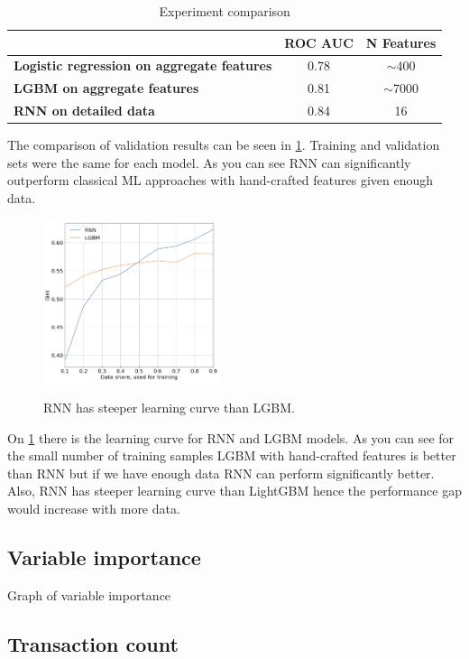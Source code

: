 \documentclass{sigkddExp}
\begin{document}
\begin{table}
\caption{Experiment comparison}
\begin{tabular}{ | p{12em} | c | c | }
\hline
& \textbf{ROC AUC} & \textbf{N Features} \\
\hline
\textbf{Logistic regression on aggregate features} & 0.78 & $\sim400$ \\
\textbf{LGBM on aggregate features} & 0.81 & $\sim7000$ \\
\textbf{RNN on detailed data} & 0.84 & 16 \\
\hline
\end{tabular}
\label{tab2}
\end{table}

The comparison of validation results can be seen in \ref{tab2}. Training and validation sets were the same for each model.  As you can see RNN can significantly outperform classical ML approaches with hand-crafted features given enough data.

\begin{figure}
  \caption{RNN has steeper learning curve than LGBM.}
  \includegraphics[width=0.46\textwidth]{learning-curve.png}
  \label{fig1}
\end{figure}

On \ref{fig1} there is the learning curve for RNN and LGBM models. As you can see for the small number of training samples LGBM with hand-crafted features is better than RNN but if we have enough data RNN can perform significantly better. Also, RNN has steeper learning curve than LightGBM hence the performance gap would increase with more data.

\subsection{Variable importance}

Graph of variable importance

\subsection{Transaction count}
\end{document}

